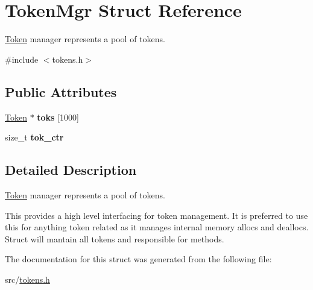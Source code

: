 \hypertarget{struct_token_mgr}{}\section{Token\+Mgr Struct Reference}
\label{struct_token_mgr}


\mbox{\hyperlink{struct_token}{Token}} manager represents a pool of tokens.  




{\ttfamily \#include $<$tokens.\+h$>$}

\subsection*{Public Attributes}
\begin{DoxyCompactItemize}
\item 
\mbox{\label{struct_token_mgr_a0863848afa7874307f5ed4d46c1a22e5}} 
\mbox{\hyperlink{struct_token}{Token}} $\ast$ {\bfseries toks} \mbox{[}1000\mbox{]}
\item 
\mbox{\label{struct_token_mgr_a764c0f04ff55f5e23b727b1c7de8003e}} 
size\+\_\+t {\bfseries tok\+\_\+ctr}
\end{DoxyCompactItemize}


\subsection{Detailed Description}
\mbox{\hyperlink{struct_token}{Token}} manager represents a pool of tokens. 

This provides a high level interfacing for token management. It is preferred to use this for anything token related as it manages internal memory allocs and deallocs. Struct will mantain all tokens and responsible for methods. 

The documentation for this struct was generated from the following file\+:\begin{DoxyCompactItemize}
\item 
src/\mbox{\hyperlink{tokens_8h}{tokens.\+h}}\end{DoxyCompactItemize}
